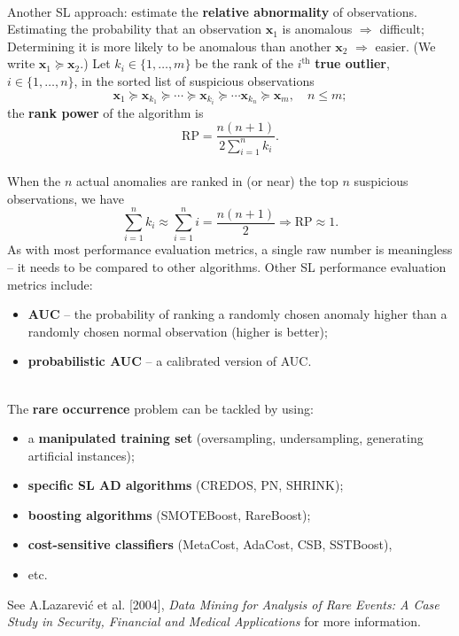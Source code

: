 \documentclass[20pt,landscape,footrule,headrule]{foils}
\newcommand{\newl}{\newline\newline}
\begin{document}
\newpage \ \\ \noindent Another SL approach: estimate the \textbf{relative abnormality} of observations. 
\newl 
Estimating the probability that an observation $\mathbf{x}_1$ is anomalous $\Longrightarrow$ difficult; \\ 
Determining it is more likely to be anomalous than another $\mathbf{x}_2$ $\Longrightarrow$ easier. (We write $\mathbf{x}_1\succeq \mathbf{x}_2$.) \newl Let $k_i\in\{1,\ldots,m\}$ be the rank of the $i^{\text{th}}$ \textbf{true outlier}, $i\in \{1,\ldots,n\}$, in the sorted list of suspicious observations $$\mathbf{x}_1\succeq \mathbf{x}_{k_1}\succeq \cdots\succeq\mathbf{x}_{k_i}\succeq \cdots \mathbf{x}_{k_n}\succeq \mathbf{x}_m,\quad n\leq m;$$ the \textbf{rank power} of the algorithm is $$\text{RP}=\frac{n(n+1)}{2\sum_{i=1}^nk_i}.$$ \newpage\ \\ \noindent When the $n$ actual anomalies are ranked in (or near) the top $n$ suspicious observations, we have $$\sum_{i=1}^nk_i\approx \sum_{i=1}^ni =\frac{n(n+1)}{2} \Longrightarrow \text{RP}\approx 1.$$ As with most performance evaluation metrics, a single raw number is meaningless -- it needs to be compared to other algorithms. \newl Other SL performance evaluation metrics include: 
\begin{itemize}
\item \textbf{AUC} --  the probability of ranking a randomly chosen anomaly higher than a randomly chosen normal observation (higher is better);
\item \textbf{probabilistic AUC} -- a calibrated version of AUC. 
\end{itemize}
\newpage \ \\ \noindent 
The \textbf{rare occurrence} problem can be tackled by using: 
\begin{itemize}
\item a \textbf{manipulated training set} (oversampling, undersampling, generating artificial instances); 
\item \textbf{specific SL AD algorithms} (CREDOS, PN, SHRINK);
\item \textbf{boosting algorithms} (SMOTEBoost, RareBoost);
\item \textbf{cost-sensitive classifiers} (MetaCost, AdaCost, CSB, SSTBoost), 
\item etc. 
\end{itemize}
See A.Lazarević {et al.} [2004], \textit{Data Mining for Analysis of Rare Events: A Case Study in Security, Financial and Medical Applications} for more information.
\end{document}
